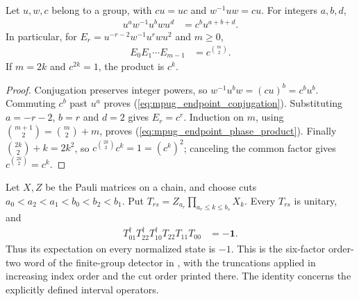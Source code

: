 \begin{lemma}
    \label{lem:mpug_detector_endpoint_phase}
    \leanok
    Let $u,w,c$ belong to a group, with $cu=uc$ and $w^{-1}uw=cu$.
    For integers $a,b,d$,
    \begin{align}
        u^aw^{-1}u^bwu^d & =c^bu^{a+b+d}.
        \label{eq:mpug_endpoint_conjugation}
    \end{align}
    In particular, for $E_r=u^{-r-2}w^{-1}u^rwu^2$ and $m\geq0$,
    \begin{align}
        E_0E_1\cdots E_{m-1} & =c^{\binom m2}.
        \label{eq:mpug_endpoint_phase_product}
    \end{align}
    If $m=2k$ and $c^{2k}=1$, the product is $c^k$.
\end{lemma}

\begin{proof}\leanok
    Conjugation preserves integer powers, so
    $w^{-1}u^bw=(cu)^b=c^bu^b$. Commuting $c^b$ past $u^a$ proves
    (\ref{eq:mpug_endpoint_conjugation}). Substituting $a=-r-2$, $b=r$ and
    $d=2$ gives $E_r=c^r$. Induction on $m$, using
    $\binom{m+1}2=\binom m2+m$, proves
    (\ref{eq:mpug_endpoint_phase_product}).
    Finally $\binom{2k}2+k=2k^2$, so
    $c^{\binom{2k}2}c^k=1=(c^k)^2$; canceling the common factor gives
    $c^{\binom{2k}2}=c^k$.
\end{proof}

\begin{lemma}
    \label{lem:mpug_finite_group_detector_endpoint}
    \leanok
    Let $X,Z$ be the Pauli matrices on a chain, and choose cuts
    $a_0<a_2<a_1<b_0<b_2<b_1$. Put
    $T_{rs}=Z_{a_r}\prod_{a_r\leq k\leq b_s}X_k$. Every $T_{rs}$ is
    unitary, and
    \begin{align}
        T_{01}^{\dagger}T_{22}^{\dagger}T_{10}^{\dagger}
        T_{22}T_{11}T_{00} & =-\mathbf 1.
        \label{eq:mpug_finite_detector_sign}
    \end{align}
    Thus its expectation on every normalized state is $-1$. This is the
    six-factor order-two word of the finite-group detector in
    \cite[Section~V]{GarreRubioSchuch2024DomainWall}, with the truncations
    applied in increasing index order and the cut order printed there.
    The identity concerns the explicitly defined interval operators.
\end{lemma}

